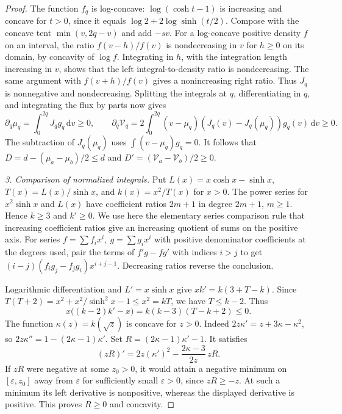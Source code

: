 \documentclass[10pt,twoside,reqno]{amsart}
\numberwithin{equation}{section}
\newcommand{\dd}{\,\mathrm{d}}
\begin{document}
\begin{proof}
The function \(f_q\) is log-concave: \(\log(\cosh t-1)\) is increasing
and concave for \(t>0\), since it equals \(\log 2+2\log\sinh(t/2)\).
Compose with the concave tent \(\min(v,2q-v)\) and add \(-sv\).
For a log-concave positive density \(f\) on an interval, the ratio
\(f(v-h)/f(v)\) is nondecreasing in \(v\) for \(h\ge0\) on its domain,
by concavity of \(\log f\). Integrating in \(h\), with the integration
length increasing in \(v\), shows that the left integral-to-density
ratio is nondecreasing. The same argument with \(f(v+h)/f(v)\) gives
a nonincreasing right ratio. Thus \(J_q\) is nonnegative and
nondecreasing. Splitting the integrals at \(q\), differentiating in
\(q\), and integrating the flux by parts now gives
\[
 \partial_q\mu_q=\int_0^{2q} J_q g_q\dd v\ge0,\qquad
 \partial_q\mathcal V_q=2\int_0^{2q}(v-\mu_q)
           (J_q(v)-J_q(\mu_q))g_q(v)\dd v\ge0 .
\]
The subtraction of \(J_q(\mu_q)\) uses \(\int(v-\mu_q)g_q=0\).
It follows that \(D=d-(\mu_a-\mu_b)/2\le d\) and
\(D'=(\mathcal V_a-\mathcal V_b)/2\ge0\).

\medskip\noindent
\textit{3. Comparison of normalized integrals.}
Put \(L(x)=x\cosh x-\sinh x\), \(T(x)=L(x)/\sinh x\), and
\(k(x)=x^2/T(x)\) for \(x>0\).
The power series for \(x^2\sinh x\) and \(L(x)\) have coefficient
ratios \(2m+1\) in degree \(2m+1\), \(m\ge1\). Hence \(k\ge3\) and
\(k'\ge0\). We use here the elementary series comparison rule that
increasing coefficient ratios give an increasing quotient of sums
on the positive axis. For series \(f=\sum f_i x^i,\ g=\sum g_i x^i\) with
positive denominator coefficients at the degrees used, pair the terms
of \(f'g-fg'\) with indices \(i>j\) to get
\((i-j)(f_i g_j-f_j g_i)x^{i+j-1}\).
Decreasing ratios reverse the conclusion.

Logarithmic differentiation and \(L'=x\sinh x\) give
\(xk'=k(3+T-k)\).
Since
\(T(T+2)=x^2+x^2/\sinh^2 x-1\le x^2=kT\), we have \(T\le k-2\).
Thus
\begin{equation}\label{eq:diff-k}
 x\bigl((k-2)k'-x\bigr)=k(k-3)(T-k+2)\le0.
\end{equation}
The function \(\kappa(z)=k(\sqrt z)\) is concave for \(z>0\).
Indeed \(2z\kappa'=z+3\kappa-\kappa^2\), so
\(2z\kappa''=1-(2\kappa-1)\kappa'\).
Set \(R=(2\kappa-1)\kappa'-1\). It satisfies
\[
 (zR)'=2z(\kappa')^2-\frac{2\kappa-3}{2z}\,zR.
\]
If \(zR\) were negative at some \(z_0>0\), it would attain a negative
minimum on \([\varepsilon,z_0]\) away from \(\varepsilon\) for
sufficiently small \(\varepsilon>0\), since \(zR\ge-z\).
At such a minimum its left derivative is nonpositive, whereas the
displayed derivative is positive. This proves \(R\ge0\) and concavity.


\end{proof}
\end{document}
